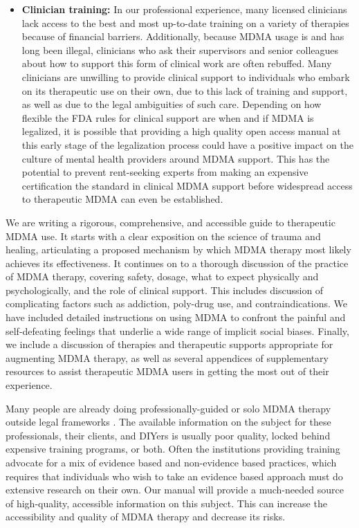 \documentclass[12pt,letterpaper]{book}
\begin{document}
\begin{itemize}
    \item \textbf{Clinician training:} In our professional experience, many licensed clinicians lack access to the best and most up-to-date training on a variety of therapies because of financial barriers. Additionally, because MDMA usage is and has long been illegal, clinicians who ask their supervisors and senior colleagues about how to support this form of clinical work are often rebuffed. Many clinicians are unwilling to provide clinical support to individuals who embark on its therapeutic use on their own, due to this lack of training and support, as well as due to the legal ambiguities of such care. Depending on how flexible the FDA rules for clinical support are when and if MDMA is legalized, it is possible that providing a high quality open access manual at this early stage of the legalization process could have a positive impact on the culture of mental health providers around MDMA support. This has the potential to prevent rent-seeking experts from making an expensive certification the standard in clinical MDMA support before widespread access to therapeutic MDMA can even be established.
\end{itemize}

We are writing a rigorous, comprehensive, and accessible guide to therapeutic MDMA use. It starts with a clear exposition on the science of trauma and healing, articulating a proposed mechanism by which MDMA therapy most likely achieves its effectiveness. It continues on to a thorough discussion of the practice of MDMA therapy, covering safety, dosage, what to expect physically and psychologically, and the role of clinical support. This includes discussion of complicating factors such as addiction, poly-drug use, and contraindications. We have included detailed instructions on using MDMA to confront the painful and self-defeating feelings that underlie a wide range of implicit social biases. Finally, we include a discussion of therapies and therapeutic supports appropriate for augmenting MDMA therapy, as well as several appendices of supplementary resources to assist therapeutic MDMA users in getting the most out of their experience.

Many people are already doing professionally-guided or solo MDMA therapy outside legal frameworks \cite{hillsSolo,passieHistory}. The available information on the subject for these professionals, their clients, and DIYers is usually poor quality, locked behind expensive training programs, or both. Often the institutions providing training advocate for a mix of evidence based and non-evidence based practices, which requires that individuals who wish to take an evidence based approach must do extensive research on their own. Our manual will provide a much-needed source of high-quality, accessible information on this subject. This can increase the accessibility and quality of MDMA therapy and decrease its risks.
\end{document}
